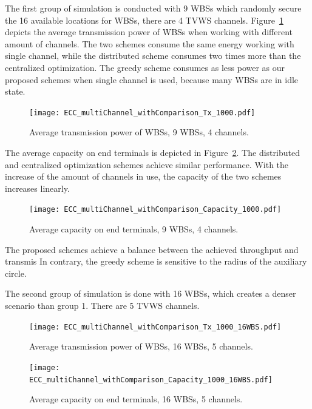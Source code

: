 \documentclass[times]{ettauth}
\theoremstyle{mytheoremstyle}
\theoremstyle{mytheoremstyle}
\theoremstyle{mytheoremstyle}
\begin{document}
The first group of simulation is conducted with 9 WBSs which randomly secure the 16 available locations for WBSs, there are 4 TVWS channels.
Figure~\ref{transPower} depicts the average transmission power of WBSs when working with different amount of channels.
The two schemes consume the same energy working with single channel, while the distributed scheme consumes two times more than the centralized optimization.
The greedy scheme consumes as less power as our proposed schemes when single channel is used, because many WBSs are in idle state. 


 \begin{figure}[h!]
    \centering
      \texttt{[image: ECC\_multiChannel\_withComparison\_Tx\_1000.pdf]}
    \caption{Average transmission power of WBSs, 9 WBSs, 4 channels.}
\label{transPower}    
  \end{figure}
  

     
The average capacity on end terminals is depicted in Figure~\ref{ECC_multiChannel_Capacity}.
The distributed and centralized optimization schemes achieve similar performance.
With the increase of the amount of channels in use, the capacity of the two schemes increases linearly.
     \begin{figure}[h!]
       \centering
       \texttt{[image: ECC\_multiChannel\_withComparison\_Capacity\_1000.pdf]}
       \caption{Average capacity on end terminals,  9 WBSs, 4 channels.}
	\label{ECC_multiChannel_Capacity}
     \end{figure}


The proposed schemes achieve a balance between the achieved throughput and transmis
In contrary, the greedy scheme is sensitive to the radius of the auxiliary circle.

The second group of simulation is done with 16 WBSs, which creates a denser scenario than group 1. 
There are 5 TVWS channels.

 \begin{figure}[h!]
    \centering
      \texttt{[image: ECC\_multiChannel\_withComparison\_Tx\_1000\_16WBS.pdf]}
    \caption{Average transmission power of WBSs,  16 WBSs, 5 channels.}
\label{transPower2}    
  \end{figure}
  
       \begin{figure}[h!]
       \centering
       \texttt{[image: ECC\_multiChannel\_withComparison\_Capacity\_1000\_16WBS.pdf]}
       \caption{Average capacity on end terminals,  16 WBSs, 5 channels.}
	\label{ECC_multiChannel_Capacity2}
     \end{figure}
\end{document}
